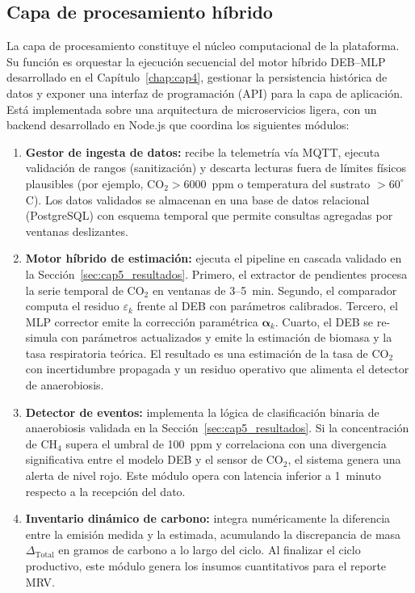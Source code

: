 \subsection{Capa de procesamiento híbrido}
\label{subsec:cap5_capa_procesamiento}

La capa de procesamiento constituye el núcleo computacional de la plataforma. Su función es orquestar la ejecución secuencial del motor híbrido DEB--MLP desarrollado en el Capítulo~\ref{chap:cap4}, gestionar la persistencia histórica de datos y exponer una interfaz de programación (API) para la capa de aplicación. Está implementada sobre una arquitectura de microservicios ligera, con un backend desarrollado en Node.js que coordina los siguientes módulos:

\begin{enumerate}
    \item \textbf{Gestor de ingesta de datos:} recibe la telemetría vía MQTT, ejecuta validación de rangos (sanitización) y descarta lecturas fuera de límites físicos plausibles (por ejemplo, CO$_2 > 6000$~ppm o temperatura del sustrato $> 60^\circ$C). Los datos validados se almacenan en una base de datos relacional (PostgreSQL) con esquema temporal que permite consultas agregadas por ventanas deslizantes.
    
    \item \textbf{Motor híbrido de estimación:} ejecuta el pipeline en cascada validado en la Sección~\ref{sec:cap5_resultados}. Primero, el extractor de pendientes procesa la serie temporal de CO$_2$ en ventanas de 3--5~min. Segundo, el comparador computa el residuo $\varepsilon_k$ frente al DEB con parámetros calibrados. Tercero, el MLP corrector emite la corrección paramétrica $\boldsymbol{\alpha}_k$. Cuarto, el DEB se re-simula con parámetros actualizados y emite la estimación de biomasa y la tasa respiratoria teórica. El resultado es una estimación de la tasa de CO$_2$ con incertidumbre propagada y un residuo operativo que alimenta el detector de anaerobiosis.
    
    \item \textbf{Detector de eventos:} implementa la lógica de clasificación binaria de anaerobiosis validada en la Sección~\ref{sec:cap5_resultados}. Si la concentración de CH$_4$ supera el umbral de 100~ppm y correlaciona con una divergencia significativa entre el modelo DEB y el sensor de CO$_2$, el sistema genera una alerta de nivel rojo. Este módulo opera con latencia inferior a 1~minuto respecto a la recepción del dato.
    
    \item \textbf{Inventario dinámico de carbono:} integra numéricamente la diferencia entre la emisión medida y la estimada, acumulando la discrepancia de masa $\Delta_{\mathrm{Total}}$ en gramos de carbono a lo largo del ciclo. Al finalizar el ciclo productivo, este módulo genera los insumos cuantitativos para el reporte MRV.
\end{enumerate}


